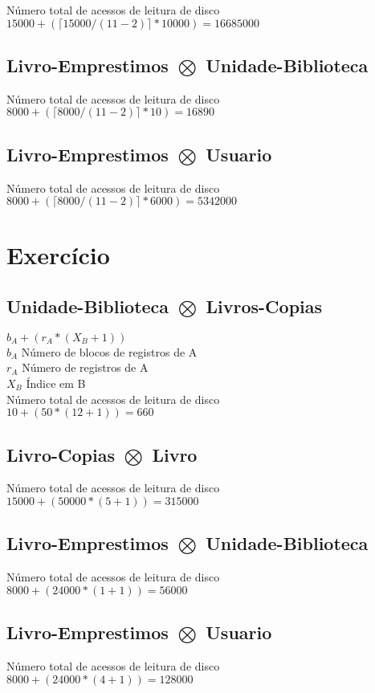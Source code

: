 \documentclass[a4paper,10pt]{article}
\begin{document}
Número total de acessos de leitura de disco\\
$15000 + (\lceil 15000/(11-2) \rceil * 10000) = 16685000$\\

\subsection{Livro-Emprestimos $\bigotimes$ Unidade-Biblioteca}

Número total de acessos de leitura de disco\\
$8000 + (\lceil 8000/(11-2) \rceil * 10) = 16890$\\

\subsection{Livro-Emprestimos $\bigotimes$ Usuario}

Número total de acessos de leitura de disco\\
$8000 + (\lceil 8000/(11-2) \rceil * 6000) = 5342000$\\


\section{Exercício}

\subsection{Unidade-Biblioteca $\bigotimes$ Livros-Copias}

$b_A+(r_A*(X_B+1))$\\
$b_A$ Número de blocos de registros de A\\
$r_A$ Número de registros de A\\
$X_B$ Índice em B\\

Número total de acessos de leitura de disco\\
$10+(50*(12+1))=660$\\

\subsection{Livro-Copias $\bigotimes$ Livro}

Número total de acessos de leitura de disco\\
$15000+(50000*(5+1))=315000$\\

\subsection{Livro-Emprestimos $\bigotimes$ Unidade-Biblioteca}

Número total de acessos de leitura de disco\\
$8000+(24000*(1+1))=56000$\\

\subsection{Livro-Emprestimos $\bigotimes$ Usuario}

Número total de acessos de leitura de disco\\
$8000+(24000*(4+1))=128000$\\
\end{document}
